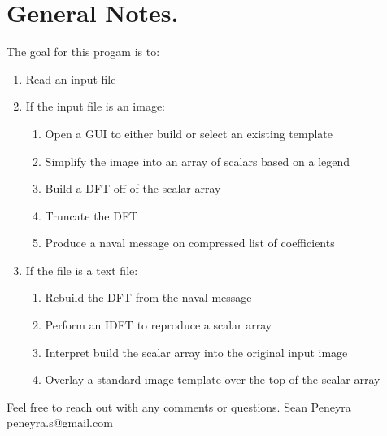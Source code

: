 \section{General Notes.}
 The goal for this progam is to:
 \begin{enumerate}
    \item Read an input file
    \item If the input file is an image:
    \begin{enumerate}
        \item Open a GUI to either build or select an existing template
        \item Simplify the image into an array of scalars based on a legend
        \item Build a DFT off of the scalar array
        \item Truncate the DFT
        \item Produce a naval message on compressed list of coefficients
    \end{enumerate}
    \item If the file is a text file:
    \begin{enumerate}
        \item Rebuild the DFT from the naval message
        \item Perform an IDFT to reproduce a scalar array
        \item Interpret build the scalar array into the original input image
        \item Overlay a standard image template over the top of the scalar array
    \end{enumerate}
\end{enumerate}

     Feel free to reach out with any comments or questions.
     Sean Peneyra
     peneyra.s@gmail.com


